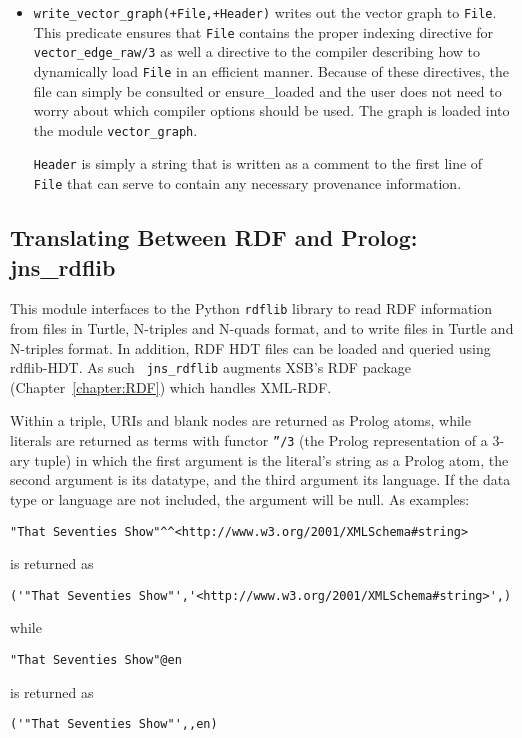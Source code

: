 \begin{itemize}
\item {\tt write\_vector\_graph(+File,+Header)} writes out the vector
  graph to {\tt File}.  This predicate ensures that {\tt File}
  contains the proper indexing directive for {\tt vector\_edge\_raw/3}
  as well a directive to the compiler describing how to dynamically
  load {\tt File} in an efficient manner.  Because of these
  directives, the file can simply be consulted or ensure\_loaded and
  the user does not need to worry about which compiler options should
  be used.  The graph is loaded into the module {\tt vector\_graph}.

  {\tt Header} is simply a string that is written as a comment to the
  first line of {\tt File} that can serve to contain any necessary
  provenance information.
\end{itemize}  

\subsection{Translating Between RDF and Prolog: jns\_rdflib} \label{sec:jns-rdflib}
This module interfaces to the Python {\tt rdflib} library to read RDF
information from files in Turtle, N-triples and N-quads format, and to
write files in Turtle and N-triples format.  In addition, RDF HDT
files can be loaded and queried using rdflib-HDT.  As such {\tt
  jns\_rdflib} augments XSB's RDF package (Chapter~\ref{chapter:RDF})
which handles XML-RDF.

Within a triple, URIs and blank nodes are returned as Prolog atoms,
while literals are returned as terms with functor {\tt ''/3} (the
Prolog representation of a 3-ary tuple) in which the first argument is
the literal's string as a Prolog atom, the second argument is its
datatype, and the third argument its language. If the data type or
language are not included, the argument will be null.  As examples:

\begin{verbatim}
"That Seventies Show"^^<http://www.w3.org/2001/XMLSchema#string> 
\end{verbatim}
is returned as 
\begin{verbatim}
('"That Seventies Show"','<http://www.w3.org/2001/XMLSchema#string>',) 
\end{verbatim}
while 
\begin{verbatim}
"That Seventies Show"@en
\end{verbatim}
is returned as
\begin{verbatim}
('"That Seventies Show"',,en) 
\end{verbatim}


